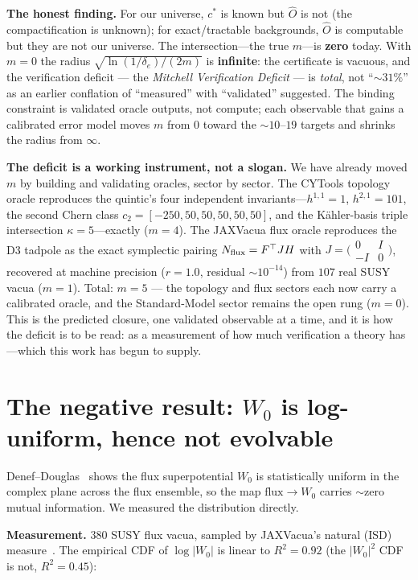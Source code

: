 \documentclass[11pt]{article}
\newcommand{\cstar}{c^{*}}
\newcommand{\oracle}{\widehat{O}}
\begin{document}
\textbf{The honest finding.} For our universe, $\cstar$ is known but $\oracle$ is not
(the compactification is unknown); for exact/tractable backgrounds, $\oracle$ is
computable but they are not our universe. The intersection---the true $m$---is
\textbf{zero} today. With $m=0$ the radius $\sqrt{\ln(1/\delta_e)/(2m)}$ is
\textbf{infinite}: the certificate is vacuous, and the verification deficit — the \emph{Mitchell Verification Deficit} — is
\emph{total}, not ``$\sim 31\%$'' as an earlier conflation of ``measured'' with
``validated'' suggested. The binding constraint is validated oracle outputs, not
compute; each observable that gains a calibrated error model moves $m$ from $0$ toward
the $\sim 10$--$19$ targets and shrinks the radius from $\infty$.

\textbf{The deficit is a working instrument, not a slogan.} We have already moved
$m$ by building and validating oracles, sector by sector. The CYTools topology
oracle reproduces the quintic's four independent invariants---$h^{1,1}=1$,
$h^{2,1}=101$, the second Chern class $c_2=[-250,50,50,50,50,50]$, and the
K\"ahler-basis triple intersection $\kappa=5$---exactly ($m=4$). The JAXVacua flux
oracle reproduces the D3 tadpole as the exact symplectic pairing
$N_{\rm flux} = F^\top J H$ with
$J=\bigl(\begin{smallmatrix}0&I\\-I&0\end{smallmatrix}\bigr)$, recovered at
machine precision ($r=1.0$, residual $\sim 10^{-14}$) from $107$ real SUSY vacua
($m=1$). Total: $m=5$ --- the topology and flux sectors each now carry a calibrated
oracle, and the Standard-Model sector remains the open rung ($m=0$). This is the
predicted closure, one validated observable at a time, and it is how the deficit
is to be read: as a measurement of how much verification a theory has---which this
work has begun to supply.

\section{The negative result: $W_0$ is log-uniform, hence not evolvable}
\label{sec:negative}

Denef--Douglas~\cite{denef} shows the flux superpotential $W_0$ is statistically
uniform in the complex plane across the flux ensemble, so the map
$\text{flux} \to W_0$ carries $\sim$zero mutual information. We measured the
distribution directly.

\textbf{Measurement.} $380$ SUSY flux vacua, sampled by JAXVacua's natural (ISD)
measure~\cite{jaxvacua}. The empirical CDF of $\log|W_0|$ is linear to $R^2 = 0.92$
(the $|W_0|^2$ CDF is not, $R^2 = 0.45$):
\end{document}
